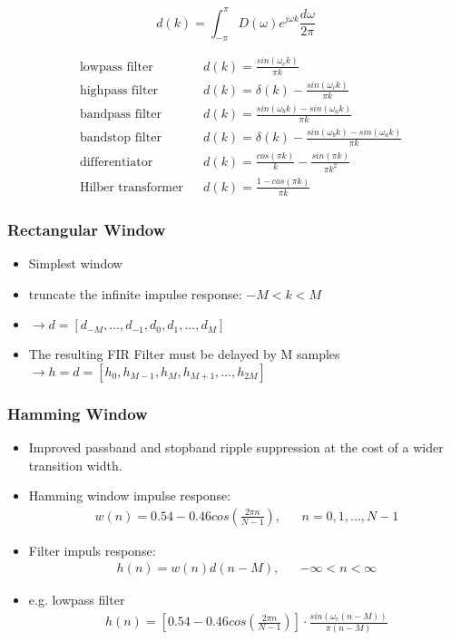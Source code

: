 \begin{equation}
d(k) = \int_{-\pi}^{\pi}D(\omega) e^{j\omega k}\frac{d\omega}{2\pi} \label{eq:impresp}
\end{equation}

\begin{align*}
&\text{lowpass filter} && d(k) = \frac{sin(\omega_ck)}{\pi k} \\
&\text{highpass filter} && d(k) = \delta(k) - \frac{sin(\omega_ck)}{\pi k} \\
&\text{bandpass filter} && d(k) = \frac{sin(\omega_bk) -sin(\omega_ak)}{\pi k} \\
&\text{bandstop filter} && d(k) = \delta(k) - \frac{sin(\omega_bk) -sin(\omega_ak)}{\pi k} \\
&\text{differentiator} && d(k) = \frac{cos(\pi k)}{k}-\frac{sin(\pi k)}{\pi k^2}\\
&\text{Hilber transformer} && d(k) = \frac{1-cos(\pi k)}{\pi k}
\end{align*}

\subsubsection{Rectangular Window}
\begin{itemize}
	\item Simplest window
	\item truncate the infinite impulse response: $-M < k < M$
	\item $\rightarrow d = [d_{-M}, ..., d_{-1}, d_0, d_1, ..., d_M]$
	\item The resulting FIR Filter must be delayed by M samples \newline
	$\rightarrow h = d = [h_0, h_{M-1}, h_M, h_{M+1}, ..., h_{2M}]$
\end{itemize}


\subsubsection{Hamming Window}
\begin{itemize}
	\item Improved passband and stopband ripple suppression at the cost of a wider transition width.
	\item Hamming window impulse response:
	\begin{align*}
		w(n) = 0.54 -0.46cos\left(\frac{2\pi n}{N-1}\right),&&n= 0,1,\dots,N-1
	\end{align*}
	\item Filter impuls response:
	\begin{align*}
		h(n) = w(n)d(n-M),&&-\infty < n < \infty
	\end{align*}
	\item e.g. lowpass filter
	\begin{align*}
		h(n) = \left[0.54 -0.46cos\left(\frac{2\pi n}{N-1}\right)\right]\cdot\frac{sin(\omega_c(n-M))}{\pi (n-M)}
	\end{align*}
\end{itemize}


